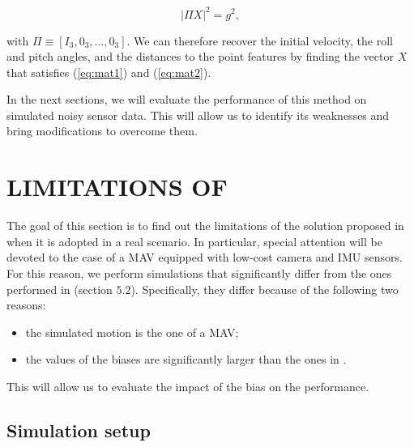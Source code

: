 \documentclass[letterpaper, 10 pt, conference]{ieeeconf}  %
\begin{document}
\begin{equation}
\label{eq:mat2}
| \Pi X | ^2 = g^2,
\end{equation}

\noindent with $\Pi \equiv [I_3, 0_3, ..., 0_3]$. We can therefore recover the initial velocity, the roll and pitch angles, and the distances to the point features
by finding the vector $X$ that satisfies (\ref{eq:mat1}) and (\ref{eq:mat2}).

In the next sections, we will evaluate the performance of this method on simulated noisy sensor data.
This will allow us to identify its weaknesses and bring modifications to overcome them.





\section{LIMITATIONS OF \cite{Martinelli2014}}\label{SectionBottlenecks}

The goal of this section is to find out the limitations of the solution proposed in \cite{Martinelli2014} when it is adopted in a real scenario. In particular, special attention will be devoted to the case of a MAV equipped with low-cost camera and IMU sensors. For this reason, we perform simulations that significantly differ from the ones performed in \cite{Martinelli2014} (section $5.2$). Specifically, they differ because of the following two reasons:
\begin{itemize}
\item the simulated motion is the one of a MAV;
\item the values of the biases are significantly larger than the ones in \cite{Martinelli2014}.
\end{itemize}
This will allow us to evaluate the impact of the bias on the performance.

\subsection{Simulation setup}\label{SubsectionConsidered}
\end{document}
